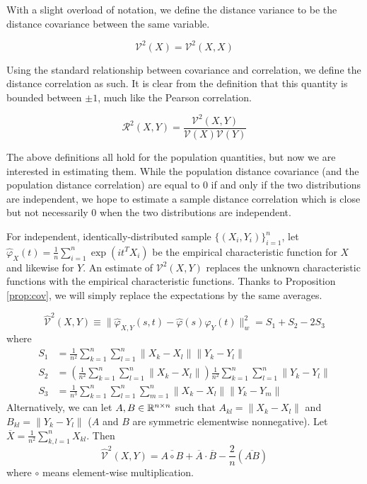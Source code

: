 With a slight overload of notation, we define the distance variance to be
the distance covariance between the same variable. 
\begin{definition}
$$ \mathcal{V}^2 (X) = \mathcal{V}^2 (X,X) $$
\end{definition}

Using the standard relationship between covariance and correlation, we 
define the distance correlation as such. It is clear from the definition
that this quantity is bounded between $\pm 1$, much like the Pearson
correlation.

\begin{definition}
$$ \mathcal{R}^2 (X,Y) = \dfrac{\mathcal{V}^2(X,Y)}
                               {\mathcal{V}(X) \mathcal{V}(Y)} $$
\end{definition}

The above definitions all hold for the population quantities, but now
we are interested in estimating them. While the population distance
covariance (and the population distance correlation) are equal to 0 if
and only if the two distributions are independent, we hope to estimate a
sample distance correlation which is close but not necessarily 0 when
the two distributions are independent.

For independent, identically-distributed sample $\{(X_i, Y_i)\}_{i=1}^n$,
let $\widehat{\varphi}_X (t) = \frac{1}{n} \sum_{i=1}^n \exp(i t^T X_i)$ 
be the empirical characteristic function for $X$ and likewise for $Y$. An
estimate of $\mathcal{V}^2(X,Y)$ replaces the unknown characteristic
functions with the empirical characteristic functions. Thanks to
Proposition \ref{prop:cov}, we will simply replace the expectations by
the same averages.

\begin{definition}
$$ \widehat{\mathcal{V}}^2 (X,Y) \equiv
\| \widehat{\varphi}_{X,Y}(s,t) -
            \widehat{\varphi}(s) \widehat{\varphi}_Y(t) \|_w^2
  = S_1 + S_2 - 2 S_3 $$
where 
\begin{align*}
S_1 &= \frac{1}{n^2} \sum_{k=1}^n \sum_{l=1}^n \|X_k - X_l\| \|Y_k - Y_l\| \\
S_2 &= \left( \frac{1}{n^2} \sum_{k=1}^n \sum_{l=1}^n \|X_k - X_l\| \right) \frac{1}{n^2} \sum_{k=1}^n \sum_{l=1}^n \|Y_k - Y_l\| \\
S_3 &= \frac{1}{n^3} \sum_{k=1}^n \sum_{l=1}^n \sum_{m=1}^n \|X_k - X_l\| \|Y_k - Y_m\|
\end{align*}
Alternatively, we can let $A, B \in \mathbb{R}^{n \times n}$ such that
$A_{kl} = \|X_k - X_l\|$ and $B_{kl} = \|Y_k - Y_l\|$ ($A$ and $B$ are
symmetric elementwise nonnegative). Let
$\overline{X} = \frac{1}{n^2} \sum_{k,l = 1}^n X_{kl}$. Then
$$ \widehat{\mathcal{V}}^2 (X,Y)
 = \overline{A \circ B} + \overline{A} \cdot \overline{B} - \frac{2}{n}
   (\overline{A B}) $$
where $\circ$ means element-wise multiplication.
\end{definition}


